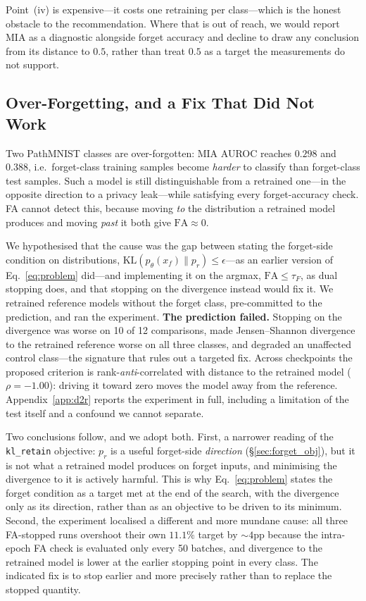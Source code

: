 \documentclass{article}
\newcommand{\klr}{\texttt{kl\_retain}}
\newcommand{\KL}{\mathrm{KL}}
\newcommand{\rev}[1]{{\color{revisedB}#1}}
\theoremstyle{remark}
\theoremstyle{plain}
\begin{document}
Point~(iv) is expensive---it costs one retraining per class---which is the
honest obstacle to the recommendation. Where that is out of reach, we would
report MIA as a diagnostic alongside forget accuracy and decline to draw any
conclusion from its distance to $0.5$, rather than treat $0.5$ as a target the
measurements do not support.

\subsection{Over-Forgetting, and a Fix That Did Not Work}\label{sec:overforget}

Two PathMNIST classes are over-forgotten: MIA AUROC reaches $0.298$ and $0.388$,
i.e.\ forget-class training samples become \emph{harder} to classify than
forget-class test samples. Such a model is still distinguishable from a
retrained one---in the opposite direction to a privacy leak---while satisfying
every forget-accuracy check. FA cannot detect this, because moving \emph{to} the
distribution a retrained model produces and moving \emph{past} it both give
$\mathrm{FA}\approx 0$.

We hypothesised that the cause was the gap between stating the forget-side
condition on distributions, \rev{$\KL(p_\theta(x_f)\|p_r)\le\epsilon$---as an
earlier version of Eq.~\ref{eq:problem} did---and implementing it on the
argmax, $\mathrm{FA}\le\tau_F$, as dual stopping does}, and that stopping on the
divergence instead would fix it. We retrained reference models
without the forget class, pre-committed to the prediction, and ran the
experiment. \textbf{The prediction failed.} Stopping on the divergence was worse
on 10 of 12 comparisons, made Jensen--Shannon divergence to the retrained
reference worse on all three classes, and degraded an unaffected control
class---the signature that rules out a targeted fix. Across checkpoints the
proposed criterion is rank-\emph{anti}-correlated with distance to the retrained
model ($\rho=-1.00$): driving it toward zero moves the model away from the
reference. Appendix~\ref{app:d2r} reports the experiment in full, including a
limitation of the test itself and a confound we cannot separate.

Two conclusions follow, and we adopt both. First, a narrower reading of the
\klr{} objective: $p_r$ is a useful forget-side \emph{direction}
(\S\ref{sec:forget_obj}), but it is not what a retrained model produces on
forget inputs, and minimising the divergence to it is actively harmful.
\rev{This is why Eq.~\ref{eq:problem} states the forget condition as a target
met at the end of the search, with the divergence only as its direction, rather
than as an objective to be driven to its minimum.} Second, the
experiment localised a different and more mundane cause: all three FA-stopped
runs overshoot their own $11.1\%$ target by ${\sim}4$pp because the intra-epoch
FA check is evaluated only every 50 batches, and divergence to the retrained
model is lower at the earlier stopping point in every class. The indicated fix
is to stop earlier and more precisely rather than to replace the stopped
quantity.
\end{document}

